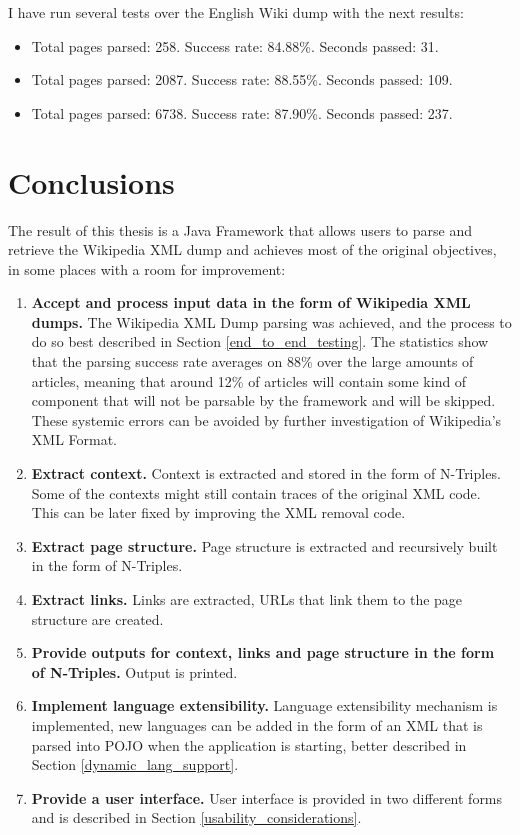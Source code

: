 \documentclass[thesis=M,english,hidelinks]{FITthesis}[2019/12/23]
\begin{document}
I have run several tests over the English Wiki dump with the next results:

\begin{itemize}
	\item Total pages parsed: 258. Success rate: 84.88\%. Seconds passed: 31.
	\item Total pages parsed: 2087. Success rate: 88.55\%. Seconds passed: 109.
	\item Total pages parsed: 6738. Success rate: 87.90\%. Seconds passed: 237.
\end{itemize}

\chapter{Conclusions}

The result of this thesis is a Java Framework that allows users to parse and retrieve the Wikipedia XML dump and achieves most of the original objectives, in some places with a room for improvement:
\begin{enumerate}
	\item \textbf{Accept and process input data in the form of Wikipedia XML dumps.} The Wikipedia XML Dump parsing was achieved, and the process to do so best described in Section \ref{end_to_end_testing}. The statistics show that the parsing success rate averages on 88\% over the large amounts of articles, meaning that around 12\% of articles will contain some kind of component that will not be parsable by the framework and will be skipped. These systemic errors can be avoided by further investigation of Wikipedia's XML Format.
	\item \textbf{Extract context.} Context is extracted and stored in the form of N-Triples. Some of the contexts might still contain traces of the original XML code. This can be later fixed by improving the XML removal code.
	\item \textbf{Extract page structure.} Page structure is extracted and recursively built in the form of N-Triples.
	\item \textbf{Extract links.} Links are extracted, URLs that link them to the page structure are created.
	\item \textbf{Provide outputs for context, links and page structure in the form of N-Triples.} Output is printed.
	\item \textbf{Implement language extensibility.} Language extensibility mechanism is implemented, new languages can be added in the form of an XML that is parsed into \gls{POJO} when the application is starting, better described in Section \ref{dynamic_lang_support}.
	\item \textbf{Provide a user interface.} User interface is provided in two different forms and is described in Section \ref{usability_considerations}.
\end{enumerate} 


\printglossaries



\end{document}
